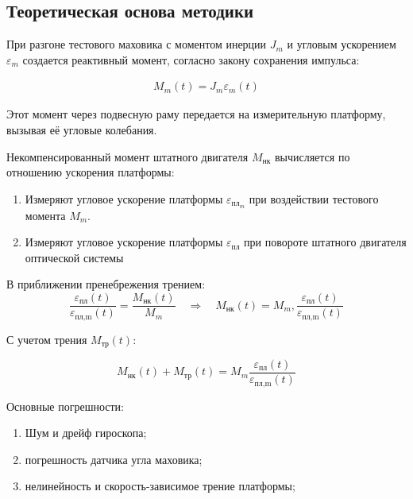 \subsection{Теоретическая основа методики}

При разгоне тестового маховика с моментом инерции $J_m$ и угловым ускорением $\varepsilon_m$ создается реактивный момент, согласно закону сохранения импульса:
\begin{samepage}
	\begin{equation}
		\label{eq:final_test_moment}
		\begin{alignedat}{2}
			M_m(t)=J_m\varepsilon_m(t)
		\end{alignedat}
	\end{equation}
\end{samepage}
Этот момент через подвесную раму передается на измерительную платформу, вызывая её угловые колебания.

Некомпенсированный момент штатного двигателя $M_{нк}$ вычисляется по отношению ускорения платформы:
\begin{enumerate}
	\item Измеряют угловое ускорение платформы $\varepsilon_{пл_m}$ при воздействии тестового момента $M_m$.
	\item Измеряют угловое ускорение платформы $\varepsilon_{пл}$ при повороте штатного двигателя оптической системы
\end{enumerate}

В приближении пренебрежения трением:
\begin{equation}
	\label{eq:Mnk}
	\frac{\varepsilon_{\text{пл}}(t)}{\varepsilon_{\text{пл,m}}(t)}
	= \frac{M_{\text{нк}}(t)}{M_m}
	\quad\Rightarrow\quad
	M_{\text{нк}}(t)
	= M_m,\frac{\varepsilon_{\text{пл}}(t)}{\varepsilon_{\text{пл,m}}(t)}
\end{equation}

С учетом трения $M_{тр}(t)$:

\begin{equation}	
	\label{eq:Mnk_trenie}
	M_{\text{нк}}(t) + M_{\text{тр}}(t)
	= M_m\frac{\varepsilon_{\text{пл}}(t)}{\varepsilon_{\text{пл,m}}(t)}
\end{equation}

Основные погрешности:
\begin{enumerate}
	\item Шум и дрейф гироскопа;
	\item погрешность датчика угла маховика;
	\item нелинейность и скорость-зависимое трение платформы;
\end{enumerate}

